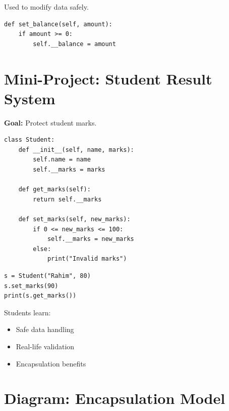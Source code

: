 Used to modify data safely.

\begin{verbatim}
def set_balance(self, amount):
    if amount >= 0:
        self.__balance = amount
\end{verbatim}

\section{Mini-Project: Student Result System}

\textbf{Goal:} Protect student marks.

\begin{verbatim}
class Student:
    def __init__(self, name, marks):
        self.name = name
        self.__marks = marks

    def get_marks(self):
        return self.__marks

    def set_marks(self, new_marks):
        if 0 <= new_marks <= 100:
            self.__marks = new_marks
        else:
            print("Invalid marks")
\end{verbatim}

\begin{verbatim}
s = Student("Rahim", 80)
s.set_marks(90)
print(s.get_marks())
\end{verbatim}

Students learn:
\begin{itemize}
    \item Safe data handling
    \item Real-life validation
    \item Encapsulation benefits
\end{itemize}

\section{Diagram: Encapsulation Model}

\begin{center}
\end{center}

